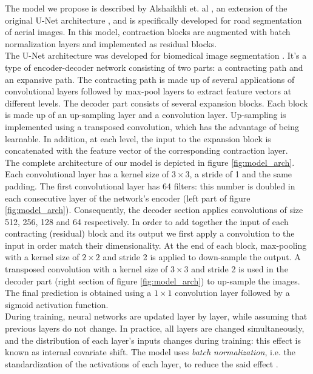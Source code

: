 \documentclass[10pt,conference,compsocconf]{IEEEtran}
\begin{document}
The model we propose is described by Alshaikhli et. al \cite{unet_roadseg}, an extension of the original U-Net architecture \cite{unet_medical}, and is specifically developed for road segmentation of aerial images. In this model, contraction blocks are augmented with batch normalization layers and implemented as residual blocks.  \\ 

The U-Net architecture was developed for biomedical image segmentation \cite{unet_medical}. It's a type of encoder-decoder network consisting of two parts: a contracting path and an expansive path. The contracting path is made up of several applications of convolutional layers followed by max-pool layers to extract feature vectors at different levels. The decoder part consists of several expansion blocks. Each block is made up of an up-sampling layer and a convolution layer. Up-sampling is implemented using a transposed convolution, which has the advantage of being learnable. In addition, at each level, the input to the expansion block is concatenated with the feature vector of the corresponding contraction layer. \\

The complete architecture of our model is depicted in figure \ref{fig:model_arch}. Each convolutional layer has a kernel size of $3 \times 3$, a  stride of 1 and the same padding. The first convolutional layer has 64 filters: this number is doubled in each consecutive layer of the network's encoder (left part of figure \ref{fig:model_arch}). Consequently, the decoder section applies convolutions of size 512, 256, 128 and 64 respectively. In order to add together the input of each contracting (residual) block and its output we first apply a convolution to the input in order match their dimensionality. At the end of each block, max-pooling with a kernel size of $2 \times 2$ and stride 2 is applied to down-sample the output. A transposed convolution with a kernel size of $3 \times 3$ and stride 2 is used in the decoder part (right section of figure \ref{fig:model_arch}) to up-sample the images. The final prediction is obtained using a $1 \times 1$ convolution layer followed by a sigmoid activation function. \\

During training, neural networks are updated layer by layer, while assuming that previous layers do not change. In practice, all layers are changed simultaneously, and the distribution of each layer’s inputs changes during training: this effect is known as internal covariate shift. The model uses \textit{batch normalization}, i.e. the standardization of the activations of each layer, to reduce the said effect \cite{batchnorm}. \\
\end{document}

